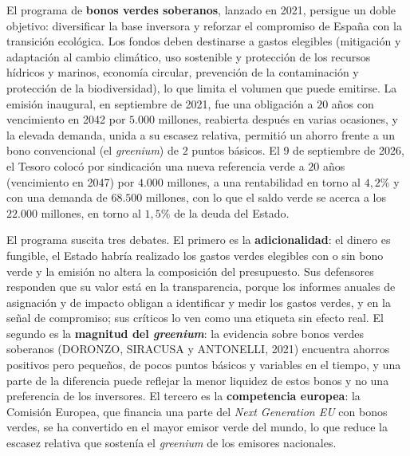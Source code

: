 \documentclass[10pt,a4paper]{article}
\begin{document}
El programa de \textbf{bonos verdes soberanos}, lanzado en 2021, persigue un doble objetivo: diversificar la base inversora y reforzar el compromiso de España con la transición ecológica. Los fondos deben destinarse a gastos elegibles (mitigación y adaptación al cambio climático, uso sostenible y protección de los recursos hídricos y marinos, economía circular, prevención de la contaminación y protección de la biodiversidad), lo que limita el volumen que puede emitirse. La emisión inaugural, en septiembre de 2021, fue una obligación a $20$ años con vencimiento en 2042 por $5.000$ millones, reabierta después en varias ocasiones, y la elevada demanda, unida a su escasez relativa, permitió un ahorro frente a un bono convencional (el \textit{greenium}) de $2$ puntos básicos. El 9 de septiembre de 2026, el Tesoro colocó por sindicación una nueva referencia verde a $20$ años (vencimiento en 2047) por $4.000$ millones, a una rentabilidad en torno al $4,2\%$ y con una demanda de $68.500$ millones, con lo que el saldo verde se acerca a los $22.000$ millones, en torno al $1,5\%$ de la deuda del Estado.

El programa suscita tres debates. El primero es la \textbf{adicionalidad}: el dinero es fungible, el Estado habría realizado los gastos verdes elegibles con o sin bono verde y la emisión no altera la composición del presupuesto. Sus defensores responden que su valor está en la transparencia, porque los informes anuales de asignación y de impacto obligan a identificar y medir los gastos verdes, y en la señal de compromiso; sus críticos lo ven como una etiqueta sin efecto real. El segundo es la \textbf{magnitud del \textit{greenium}}: la evidencia sobre bonos verdes soberanos (DORONZO, SIRACUSA y ANTONELLI, 2021) encuentra ahorros positivos pero pequeños, de pocos puntos básicos y variables en el tiempo, y una parte de la diferencia puede reflejar la menor liquidez de estos bonos y no una preferencia de los inversores. El tercero es la \textbf{competencia europea}: la Comisión Europea, que financia una parte del \textit{Next Generation EU} con bonos verdes, se ha convertido en el mayor emisor verde del mundo, lo que reduce la escasez relativa que sostenía el \textit{greenium} de los emisores nacionales.
\end{document}
